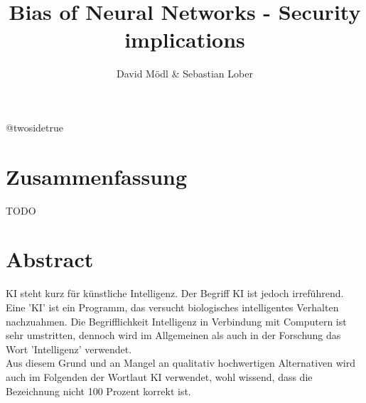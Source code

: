 \documentclass[12pt,oneside,a4paper,parskip]{scrbook}
\makeatletter
\def\BaAuthorStudyProgram{Informatik} %
\def\BaType{Seminararbeit} %
\def\BaTitle{Bias of Neural Networks - Security implications}
\def\BaSupervisorOne{Prof.\ Dr.\ A B}
\def\BaSupervisorTwo{Prof.\ Dr.\ C D}
\def\BaDeadline{\today}
\newcommand*{\forcetwosidetitle}[1][1]{%
 \begingroup
   \cleardoubleoddpage
   \KOMAoptions{titlepage=true}%
   \csname @twosidetrue\endcsname
   \maketitle[{#1}]
 \endgroup
}
\makeatother
\begin{document}


\frontmatter
\titlehead{%
  {Hochschule für angewandte Wissenschaften Würzburg-Schweinfurt\\
   Fakultät Informatik und Wirtschaftsinformatik}}
\subject{\BaType}
\title{\BaTitle\\[15mm]}
\author{David Mödl \& Sebastian Lober}
\forcetwosidetitle



\section*{Zusammenfassung}

TODO

\section*{Abstract}
KI steht kurz für künstliche Intelligenz. Der Begriff KI ist jedoch irreführend. Eine 'KI' ist ein Programm, das versucht biologisches intelligentes Verhalten nachzuahmen. Die Begrifflichkeit Intelligenz in Verbindung mit Computern ist sehr umstritten, dennoch wird im Allgemeinen als auch in der Forschung das Wort 'Intelligenz' verwendet. \\
Aus diesem Grund und an Mangel an qualitativ hochwertigen Alternativen wird auch im Folgenden der Wortlaut KI verwendet, wohl wissend, dass die Bezeichnung nicht 100 Prozent korrekt ist.

\tableofcontents



\mainmatter
\end{document}

